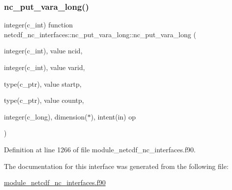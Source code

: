\subsubsection{\texorpdfstring{nc\+\_\+put\+\_\+vara\+\_\+long()}{nc\_put\_vara\_long()}}
{\footnotesize\ttfamily integer(c\+\_\+int) function netcdf\+\_\+nc\+\_\+interfaces\+::nc\+\_\+put\+\_\+vara\+\_\+long\+::nc\+\_\+put\+\_\+vara\+\_\+long (\begin{DoxyParamCaption}\item[{integer(c\+\_\+int), value}]{ncid,  }\item[{integer(c\+\_\+int), value}]{varid,  }\item[{type(c\+\_\+ptr), value}]{startp,  }\item[{type(c\+\_\+ptr), value}]{countp,  }\item[{integer(c\+\_\+long), dimension($\ast$), intent(in)}]{op }\end{DoxyParamCaption})}



Definition at line 1266 of file module\+\_\+netcdf\+\_\+nc\+\_\+interfaces.\+f90.



The documentation for this interface was generated from the following file\+:\begin{DoxyCompactItemize}
\item 
\hyperlink{module__netcdf__nc__interfaces_8f90}{module\+\_\+netcdf\+\_\+nc\+\_\+interfaces.\+f90}\end{DoxyCompactItemize}
